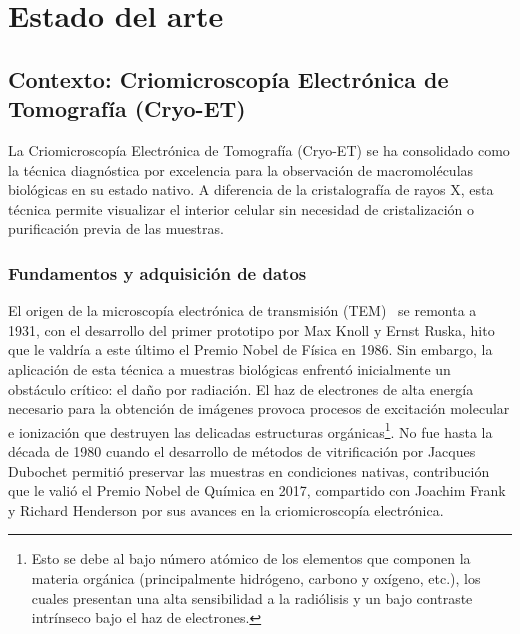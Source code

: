 

\chapter{Estado del arte}

\section{Contexto: Criomicroscopía Electrónica de Tomografía (Cryo-ET)}
La Criomicroscopía Electrónica de Tomografía (Cryo-ET) se ha consolidado como la técnica diagnóstica por excelencia para la observación de macromoléculas biológicas en su estado nativo. A diferencia de la cristalografía de rayos X, esta técnica permite visualizar el interior celular sin necesidad de cristalización o purificación previa de las muestras.

\subsection{Fundamentos y adquisición de datos}

El origen de la microscopía electrónica de transmisión (TEM)~\cite{wikipedia_cryoet} se remonta a 1931, con el desarrollo del primer prototipo por Max Knoll y Ernst Ruska, hito que le valdría a este último el Premio Nobel de Física en 1986. Sin embargo, la aplicación de esta técnica a muestras biológicas enfrentó inicialmente un obstáculo crítico: el daño por radiación. El haz de electrones de alta energía necesario para la obtención de imágenes provoca procesos de excitación molecular e ionización que destruyen las delicadas estructuras orgánicas\footnote{Esto se debe al bajo número atómico de los elementos que componen la materia orgánica (principalmente hidrógeno, carbono y oxígeno, etc.), los cuales presentan una alta sensibilidad a la radiólisis y un bajo contraste intrínseco bajo el haz de electrones.}. No fue hasta la década de 1980 cuando el desarrollo de métodos de vitrificación por Jacques Dubochet permitió preservar las muestras en condiciones nativas, contribución que le valió el Premio Nobel de Química en 2017, compartido con Joachim Frank y Richard Henderson por sus avances en la criomicroscopía electrónica.\\

